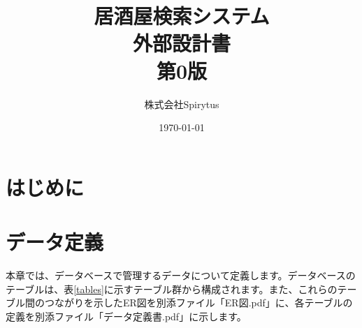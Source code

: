 \documentclass[a4j,titlepage]{jarticle}
\title{居酒屋検索システム\\
外部設計書\\
第0版}
\author{株式会社Spirytus}
\date{\today}
\begin{document}
\maketitle
\tableofcontents

\section{はじめに}

\section{データ定義}
本章では、データベースで管理するデータについて定義します。データベースのテーブルは、表\ref{tables}に示すテーブル群から構成されます。また、これらのテーブル間のつながりを示したER図を別添ファイル「ER図.pdf」に、各テーブルの定義を別添ファイル「データ定義書.pdf」に示します。
​
\end{document}
